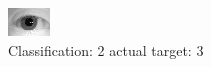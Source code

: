 \begin{figure}[h!]
\begin{center}
\includegraphics[width=0.60\columnwidth]{figures/ID1195_class_2_target_3.png}
\end{center}
\caption{ Classification: 2 actual target: 3}
\label{fig:ID1195_class_2_target_3}
\end{figure}
